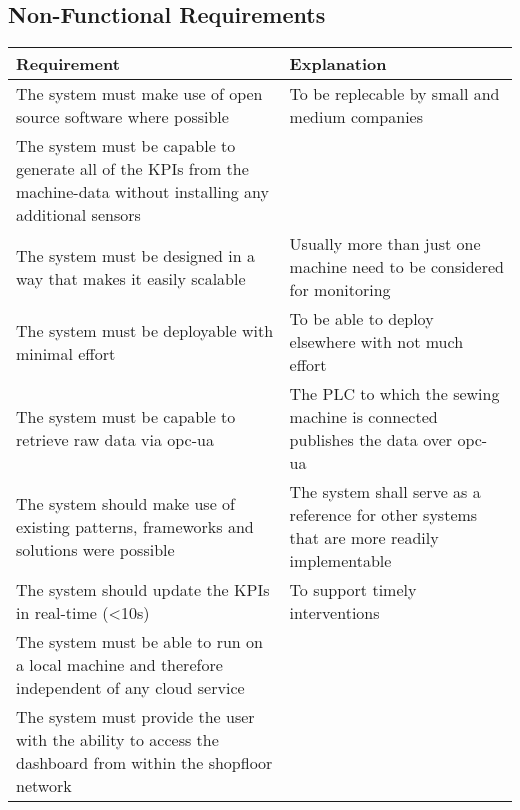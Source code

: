 \subsection{Non-Functional Requirements} %
\begin{tabularx}{\textwidth}{|X|X|}
	\hline
\textbf{Requirement}	&  \textbf{Explanation}\\
	\hline
The system must make use of open source software where possible	&  To be replecable by small and medium companies\\
	\hline
The system must be capable to generate all of the KPIs from the machine-data without installing any additional sensors	&  \\
	\hline
The system must be designed in a way that makes it easily scalable	&  Usually more than just one machine need to be considered for monitoring\\
	\hline
The system must be deployable with minimal effort	&  To be able to deploy elsewhere with not much effort \\
	\hline
The system must be capable to retrieve raw data via opc-ua	&  The PLC to which the sewing machine is connected publishes the data over opc-ua\\
	\hline
The system should make use of existing patterns, frameworks and solutions were possible	&  The system shall serve as a reference for other systems that are more readily implementable\\
	\hline
The system should update the KPIs in real-time (<10s)	&  To support timely interventions\\
	\hline
 The system must be able to run on a local machine and therefore independent of any cloud service	&  \\
	\hline
The system must provide the user with the ability to access the dashboard from within the shopfloor network	&  \\
	\hline
\end{tabularx}

